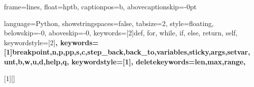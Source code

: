   
  
 {frame=lines,
  float=hptb,
  captionpos=b,
  abovecaptionskip=-0pt}

 {language=Python,
  showstringspaces=false,
  tabsize=2,
  style=floating,
  belowskip=-0\baselineskip,
  aboveskip=-0\baselineskip,
  keywords=[2]{def, for, while, if, else, return, self},
  keywordstyle=[2]\ttfamily\bfseries,
  keywords=[1]{breakpoint,n,p,pp,s,c,step_back,back_to,variables,sticky,args,setvar,unt,b,w,u,d,help,q},
  keywordstyle=[1]\ttfamily\bfseries\color{blue},
  deletekeywords={len,max,range},
}

 [1][]
 {\lstset{style=py,#1}}{}  

\newcommand{\spy}[1]{\lstinline[style=py]{#1}}


\usepackage[many]{tcolorbox} 
\usepackage{setspace} 

\setlength\parindent{0pt}   %
\pagestyle{empty}           %




\newtcolorbox{highlight}{
    colback = sub, 
    colframe = main, 
    boxrule = 0pt, 
    leftrule = 3pt %
}



